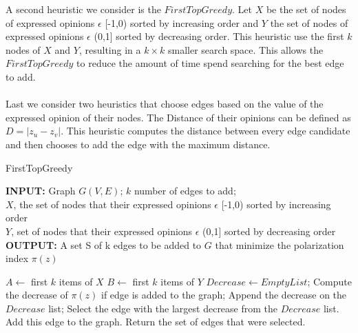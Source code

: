 \noindent A second heuristic we consider is the $FirstTopGreedy$. Let $X$ be the set of nodes of expressed opinions $\epsilon$ [-1,0) sorted by increasing order and $Y$ the set of nodes of expressed opinions $\epsilon$ (0,1] sorted by decreasing order. This heuristic use the first $k$ nodes of $X$ and $Y$, resulting in  a $k \times k$ smaller search space. This allows the $FirstTopGreedy$ to reduce the amount of time spend searching for the best edge to add. \noindent 
\\
\\
Last we consider two heuristics that choose edges based on the value of the expressed opinion of their nodes. The Distance of their opinions can be defined as $D=|z_u - z_v|$. This heuristic computes the distance between every edge candidate and then chooses to add the edge with the maximum distance.

\begin{algorithm}[htbp]
	\caption{FirstTopGreedy}
	\label{alg:kgreedy}
	
	\begin{flushleft}
        		\textbf{INPUT:} Graph $G(V, E)$; $k$ number of edges to add;\\
		$X$, the set of nodes that their expressed opinions $\epsilon$ [-1,0) sorted by increasing order\\
		$Y$, set of nodes that their expressed opinions $\epsilon$ (0,1]  sorted by decreasing order\\
		\vspace{6pt}
        		\textbf{OUTPUT:} A set S of k edges to be added to $G$ that minimize the polarization \\ index $\pi(z)$
	\end{flushleft}
	
	\begin{algorithmic}[1]
		\STATE $A \leftarrow $ first $k$ items of $X$
		\STATE $B \leftarrow $ first $k$ items of $Y$
			\STATE$Decrease \leftarrow Empty List$;
				\STATE Compute the decrease of $\pi(z)$ if edge is added to the graph;
				\STATE Append the decrease on the $Decrease$ list;
			\ENDFOR
			\STATE Select the edge with the largest decrease from the $Decrease$ list.
			\STATE Add this edge to the graph.
		\ENDFOR
		\STATE Return the set of edges that were selected.
	\end{algorithmic}
	
\end{algorithm}
		
